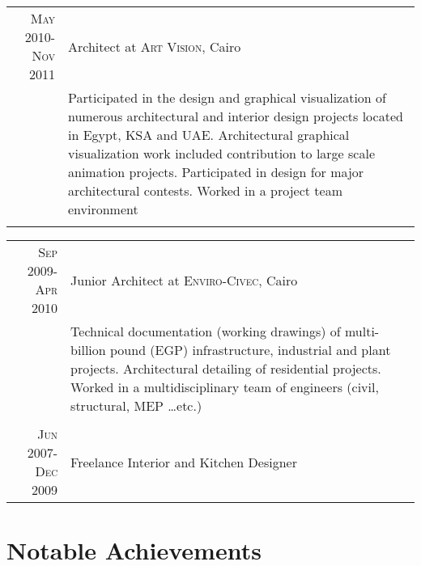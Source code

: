 \documentclass[a4paper,11pt]{article} %
\begin{document}
\begin{tabular}{r|p{11cm}}

\textsc{May 2010-Nov 2011} & Architect at \textsc{Art Vision}, Cairo \emph{}\\
& \footnotesize{Participated in the design and graphical visualization of numerous architectural and interior design projects located in Egypt, KSA and UAE. Architectural graphical visualization work included contribution to large scale animation projects. Participated in design for major architectural contests. Worked in a project team environment}\\
\multicolumn{2}{c}{} \\
\end{tabular}


\newpage

\begin{tabular}{r|p{11cm}}
\textsc{Sep 2009-Apr 2010} & Junior Architect at \textsc{Enviro-Civec}, Cairo \emph{}\\
& \footnotesize{Technical documentation (working drawings) of multi-billion pound (EGP) infrastructure, industrial and plant projects. Architectural detailing of residential projects. Worked in a multidisciplinary team of engineers (civil, structural, MEP \ldots{}etc.)}\\
\multicolumn{2}{c}{} \\


\textsc{Jun 2007-Dec 2009} & Freelance Interior and Kitchen Designer\\
\end{tabular}

\vspace{0.5cm}


\section{Notable Achievements}
\end{document}

